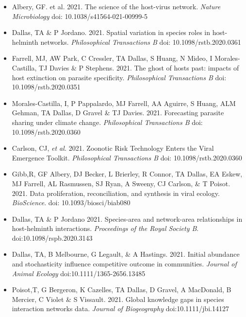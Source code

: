 \documentclass[]{CV}
\begin{document}
{}

\begin{itemize}

\item Albery, GF. et al. 2021. The science of the host-virus network. \textit{Nature Microbiology} doi: 10.1038/s41564-021-00999-5

\item {\mefont Dallas, TA} \& P Jordano. 2021. Spatial variation in species roles in host-helminth networks. \textit{Philosophical Transactions B} doi: 10.1098/rstb.2020.0361

\item Farrell, MJ, AW Park, C Cressler, {\mefont TA Dallas}, S Huang, N Mideo, I Morales-Castilla, TJ Davies \& P Stephens. 2021. The ghost of hosts past: impacts of host extinction on parasite specificity. \textit{Philosophical Transactions B} doi: 10.1098/rstb.2020.0351

\item Morales-Castilla, I, P Pappalardo, MJ Farrell, AA Aguirre, S Huang, ALM Gehman, {\mefont TA Dallas}, D Gravel \& TJ Davies. 2021. Forecasting parasite sharing under climate change. \textit{Philosophical Transactions B} doi: 10.1098/rstb.2020.0360

\item Carlson, CJ, \textit{et al.} 2021. Zoonotic Risk Technology Enters the Viral Emergence Toolkit. \textit{Philosophical Transactions B} doi: 10.1098/rstb.2020.0360

\item Gibb,R, GF Albery, DJ Becker, L Brierley, R Connor, {\mefont TA Dallas}, EA Eskew, MJ Farrell, AL Rasmussen, SJ Ryan, A Sweeny, CJ Carlson, \& T Poisot. 2021. Data proliferation, reconciliation, and synthesis in viral ecology. \textit{BioScience}. doi: 10.1093/biosci/biab080

\item {\mefont Dallas, TA} \& P Jordano 2021. Species-area and network-area relationships in host-helminth interactions. \textit{Proceedings of the Royal Society B}. doi:10.1098/rspb.2020.3143

\item {\mefont Dallas, TA}, B Melbourne, G Legault, \& A Hastings. 2021. Initial abundance and stochasticity influence competitive outcome in communities. \textit{Journal of Animal Ecology} doi:10.1111/1365-2656.13485

\item Poisot,T, G Bergeron, K Cazelles, {\mefont TA Dallas}, D Gravel, A MacDonald, B Mercier, C Violet \& S Vissault. 2021. Global knowledge gaps in species interaction networks data. \textit{Journal of Biogeography} doi:10.1111/jbi.14127


\end{itemize}
\end{document}
